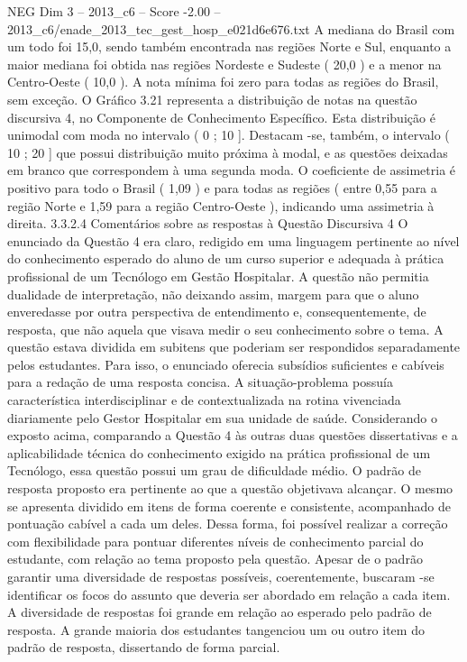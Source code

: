 \begin{textsample}{NEG Dim 3 – 2013\_c6 – Score -2.00 – 2013\_c6/enade\_2013\_tec\_gest\_hosp\_e021d6e676.txt}
A mediana do Brasil com um todo foi 15,0, sendo também encontrada nas regiões Norte e Sul, enquanto a maior mediana foi obtida nas regiões Nordeste e Sudeste ( 20,0 ) e a menor na Centro-Oeste ( 10,0 ).
A nota mínima foi zero para todas as regiões do Brasil, sem exceção.
O Gráfico 3.21 representa a distribuição de notas na questão discursiva 4, no Componente de Conhecimento Específico.
Esta distribuição é unimodal com moda no intervalo ( 0 ; 10 ].
Destacam -se, também, o intervalo ( 10 ; 20 ] que possui distribuição muito próxima à modal, e as questões deixadas em branco que correspondem à uma segunda moda.
O coeficiente de assimetria é positivo para todo o Brasil ( 1,09 ) e para todas as regiões ( entre 0,55 para a região Norte e 1,59 para a região Centro-Oeste ), indicando uma assimetria à direita. 3.3.2.4 Comentários sobre as respostas à Questão Discursiva 4 O enunciado da Questão 4 era claro, redigido em uma linguagem pertinente ao nível do conhecimento esperado do aluno de um curso superior e adequada à prática profissional de um Tecnólogo em Gestão Hospitalar.
A questão não permitia dualidade de interpretação, não deixando assim, margem para que o aluno enveredasse por outra perspectiva de entendimento e, consequentemente, de resposta, que não aquela que visava medir o seu conhecimento sobre o tema.
A questão estava dividida em subitens que poderiam ser respondidos separadamente pelos estudantes.
Para isso, o enunciado oferecia subsídios suficientes e cabíveis para a redação de uma resposta concisa.
A situação-problema possuía característica interdisciplinar e de contextualizada na rotina vivenciada diariamente pelo Gestor Hospitalar em sua unidade de saúde.
Considerando o exposto acima, comparando a Questão 4 às outras duas questões dissertativas e a aplicabilidade técnica do conhecimento exigido na prática profissional de um Tecnólogo, essa questão possui um grau de dificuldade médio.
O padrão de resposta proposto era pertinente ao que a questão objetivava alcançar.
O mesmo se apresenta dividido em itens de forma coerente e consistente, acompanhado de pontuação cabível a cada um deles.
Dessa forma, foi possível realizar a correção com flexibilidade para pontuar diferentes níveis de conhecimento parcial do estudante, com relação ao tema proposto pela questão.
Apesar de o padrão garantir uma diversidade de respostas possíveis, coerentemente, buscaram -se identificar os focos do assunto que deveria ser abordado em relação a cada item.
A diversidade de respostas foi grande em relação ao esperado pelo padrão de resposta.
A grande maioria dos estudantes tangenciou um ou outro item do padrão de resposta, dissertando de forma parcial.

\end{textsample}
